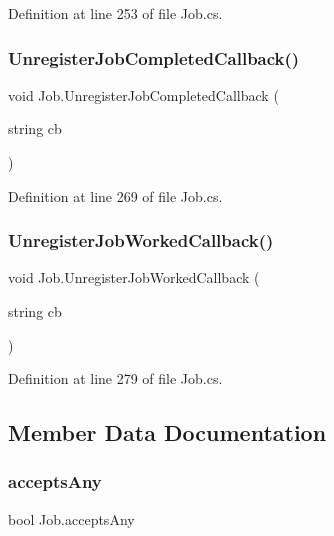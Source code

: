 Definition at line 253 of file Job.\+cs.

\mbox{\label{class_job_a97e78583a5f2291a03499e485109499e}} 
\subsubsection{\texorpdfstring{Unregister\+Job\+Completed\+Callback()}{UnregisterJobCompletedCallback()}}
{\footnotesize\ttfamily void Job.\+Unregister\+Job\+Completed\+Callback (\begin{DoxyParamCaption}\item[{string}]{cb }\end{DoxyParamCaption})}



Definition at line 269 of file Job.\+cs.

\mbox{\label{class_job_a3abd52db21d9340c3055035c203a8577}} 
\subsubsection{\texorpdfstring{Unregister\+Job\+Worked\+Callback()}{UnregisterJobWorkedCallback()}}
{\footnotesize\ttfamily void Job.\+Unregister\+Job\+Worked\+Callback (\begin{DoxyParamCaption}\item[{string}]{cb }\end{DoxyParamCaption})}



Definition at line 279 of file Job.\+cs.



\subsection{Member Data Documentation}
\mbox{\label{class_job_a92c1d5af0a58eb2c34cba2be7b4e3f97}} 
\subsubsection{\texorpdfstring{accepts\+Any}{acceptsAny}}
{\footnotesize\ttfamily bool Job.\+accepts\+Any}




